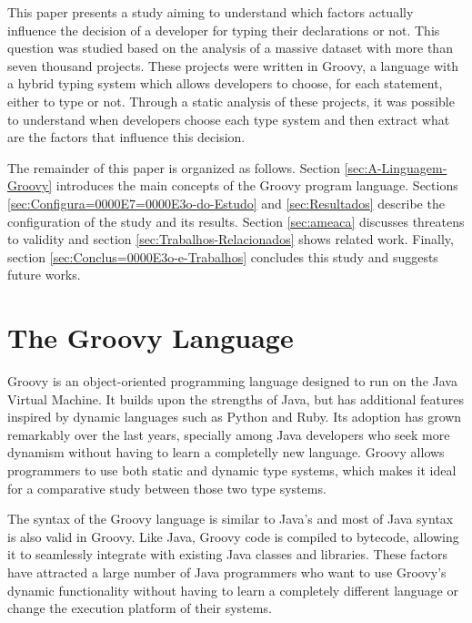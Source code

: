 \documentclass[preprint]{sigplanconf}
\begin{document}
This paper presents a study aiming to understand which factors actually influence the decision of a developer for typing their declarations or not. 
This question was studied based on the analysis of a massive dataset with more than seven thousand projects.
These projects were written in Groovy, a language with a hybrid typing system which allows developers to choose, for each statement, either to type or not.
Through a static analysis of these projects, it was possible to understand when developers choose each type system and then extract what are the factors that influence this decision.

The remainder of this paper is organized as follows. 
Section \ref{sec:A-Linguagem-Groovy} introduces the main concepts of the Groovy program language. 
Sections \ref{sec:Configura=0000E7=0000E3o-do-Estudo} and \ref{sec:Resultados} describe the configuration of the study and its results. 
Section \ref{sec:ameaca} discusses threatens to validity and section \ref{sec:Trabalhos-Relacionados} shows related work. 
Finally, section  \ref{sec:Conclus=0000E3o-e-Trabalhos} concludes this study and suggests future works.















%
%

\section{The Groovy Language\label{sec:A-Linguagem-Groovy}}
Groovy is an object-oriented programming language designed to run on the Java Virtual Machine.
It builds upon the strengths of Java, but has additional features inspired by dynamic languages such as Python and Ruby.
Its adoption has grown remarkably over the last years, specially among Java developers who seek more dynamism without having to learn a completelly new language.
Groovy allows programmers to use both static and dynamic type systems, which makes it ideal for a comparative study between those two type systems.

The syntax of the Groovy language is similar to Java's and most of Java syntax is also valid in Groovy.
Like Java, Groovy code is compiled to bytecode, allowing it to seamlessly integrate with existing Java classes and libraries. 
These factors have attracted a large number of Java programmers who want to use Groovy's dynamic functionality without having to learn a completely different language or change the execution platform of their systems. 
\end{document}
